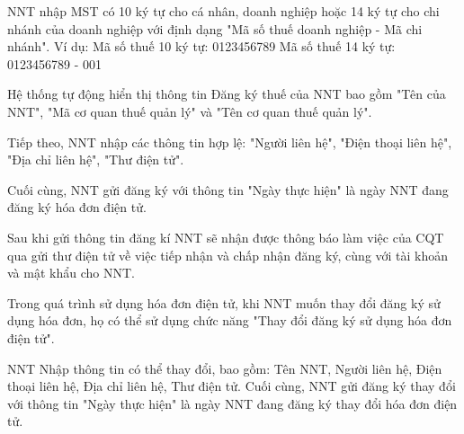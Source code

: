 
NNT nhập MST có 10 ký tự cho cá nhân, doanh nghiệp hoặc 14 ký tự cho chi nhánh của doanh nghiệp với định dạng "Mã số thuế doanh nghiệp - Mã chi nhánh".
Ví dụ:
Mã số thuế 10 ký tự: 0123456789
Mã số thuế 14 ký tự: 0123456789 - 001

Hệ thống tự động hiển thị thông tin Đăng ký thuế của NNT bao gồm "Tên của NNT", "Mã cơ quan thuế quản lý" và "Tên cơ quan thuế quản lý".

Tiếp theo, NNT nhập các thông tin hợp lệ: "Người liên hệ", "Điện thoại liên hệ", "Địa chỉ liên hệ", "Thư điện tử".

Cuối cùng, NNT gửi đăng ký với thông tin "Ngày thực hiện" là ngày NNT đang đăng ký hóa đơn điện tử.

Sau khi gửi thông tin đăng kí NNT sẽ nhận được thông báo làm việc của CQT qua gửi thư điện tử về việc tiếp nhận và chấp nhận đăng ký, cùng với tài khoản và mật khẩu cho NNT.





Trong quá trình sử dụng hóa đơn điện tử, khi NNT muốn thay đổi đăng ký sử dụng hóa đơn, họ có thể sử dụng chức năng "Thay đổi đăng ký sử dụng hóa đơn điện tử".

NNT Nhập thông tin có thể thay đổi, bao gồm: Tên NNT, Người liên hệ, Điện thoại liên hệ, Địa chỉ liên hệ, Thư điện tử.
Cuối cùng, NNT gửi đăng ký thay đổi với thông tin "Ngày thực hiện" là ngày NNT đang đăng ký thay đổi hóa đơn điện tử.

